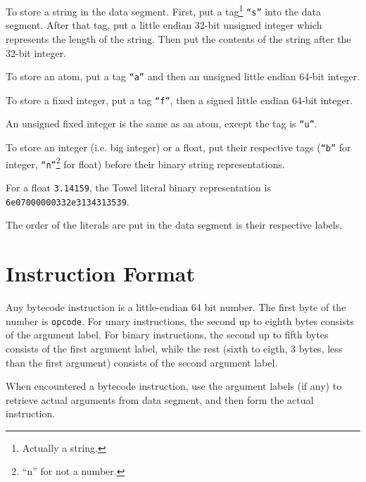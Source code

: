 \documentclass{report}
\begin{document}
To store a string in the data segment. First, put a tag\footnote{Actually a string.} \texttt{``s''} into the data segment. After that tag, put a little endian 32-bit unsigned integer which represents the length of the string. Then put the contents of the string after the 32-bit integer.

To store an atom, put a tag \texttt{``a''} and then an unsigned little endian 64-bit integer.

To store a fixed integer, put a tag \texttt{``f''}, then a signed little endian 64-bit integer.

An unsigned fixed integer is the same as an atom, except the tag is \texttt{``u''}.

To store an integer (i.e. big integer) or a float, put their respective tags (\texttt{``b''} for integer, \texttt{``n''}\footnote{``n'' for not a number.} for float) before their binary string representations.

\begin{mdframed}[style=example]
  For a float \texttt{3.14159}, the Towel literal binary
  representation is \texttt{6e07000000332e3134313539}.
\end{mdframed}


The order of the literals are put in the data segment is their respective labels.

\section{Instruction Format}

Any bytecode instruction is a little-endian 64 bit number. The first byte of the number is \texttt{opcode}. For unary instructions, the second up to eighth bytes consists of the argument label. For binary instructions, the second up to fifth bytes consists of the first argument label, while the rest (sixth to eigth, 3 bytes, less than the first argument) consists of the second argument label.

When encountered a bytecode instruction, use the argument labels (if any) to retrieve actual arguments from data segment, and then form the actual instruction.
\end{document}
